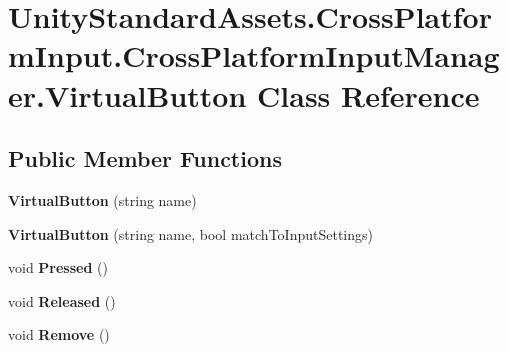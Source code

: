 \hypertarget{class_unity_standard_assets_1_1_cross_platform_input_1_1_cross_platform_input_manager_1_1_virtual_button}{}\section{Unity\+Standard\+Assets.\+Cross\+Platform\+Input.\+Cross\+Platform\+Input\+Manager.\+Virtual\+Button Class Reference}
\label{class_unity_standard_assets_1_1_cross_platform_input_1_1_cross_platform_input_manager_1_1_virtual_button}
\subsection*{Public Member Functions}
\begin{DoxyCompactItemize}
\item 
{\bfseries Virtual\+Button} (string name)\hypertarget{class_unity_standard_assets_1_1_cross_platform_input_1_1_cross_platform_input_manager_1_1_virtual_button_a138a841bb53ba6eb68793aa15b677e09}{}\label{class_unity_standard_assets_1_1_cross_platform_input_1_1_cross_platform_input_manager_1_1_virtual_button_a138a841bb53ba6eb68793aa15b677e09}

\item 
{\bfseries Virtual\+Button} (string name, bool match\+To\+Input\+Settings)\hypertarget{class_unity_standard_assets_1_1_cross_platform_input_1_1_cross_platform_input_manager_1_1_virtual_button_aee8ba0ad3aaf52e8609f0e321e69c4c1}{}\label{class_unity_standard_assets_1_1_cross_platform_input_1_1_cross_platform_input_manager_1_1_virtual_button_aee8ba0ad3aaf52e8609f0e321e69c4c1}

\item 
void {\bfseries Pressed} ()\hypertarget{class_unity_standard_assets_1_1_cross_platform_input_1_1_cross_platform_input_manager_1_1_virtual_button_a286f1c4c3001579bf3268312620808e7}{}\label{class_unity_standard_assets_1_1_cross_platform_input_1_1_cross_platform_input_manager_1_1_virtual_button_a286f1c4c3001579bf3268312620808e7}

\item 
void {\bfseries Released} ()\hypertarget{class_unity_standard_assets_1_1_cross_platform_input_1_1_cross_platform_input_manager_1_1_virtual_button_a0fc705bf079daeec58834c0eda4787ed}{}\label{class_unity_standard_assets_1_1_cross_platform_input_1_1_cross_platform_input_manager_1_1_virtual_button_a0fc705bf079daeec58834c0eda4787ed}

\item 
void {\bfseries Remove} ()\hypertarget{class_unity_standard_assets_1_1_cross_platform_input_1_1_cross_platform_input_manager_1_1_virtual_button_ac421e5de77f8384401a3e20d18101401}{}\label{class_unity_standard_assets_1_1_cross_platform_input_1_1_cross_platform_input_manager_1_1_virtual_button_ac421e5de77f8384401a3e20d18101401}

\end{DoxyCompactItemize}
